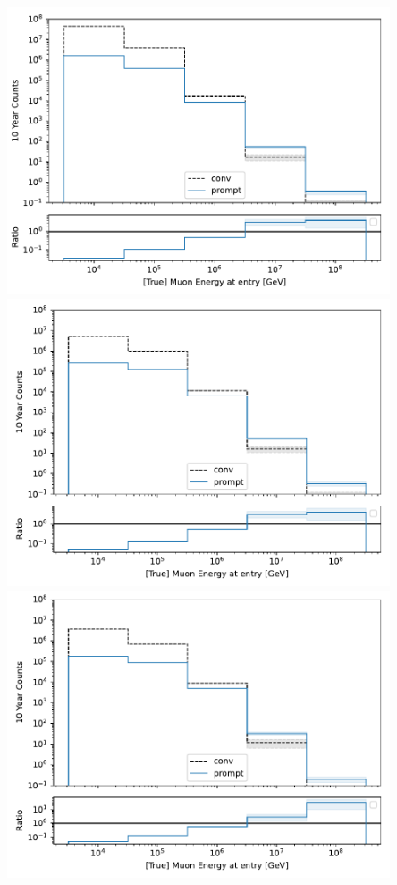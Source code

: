 \documentclass[aspectratio=1610, 9pt]{beamer}
\begin{document}
\begin{frame}
\begin{minipage}[t]{0.24\textwidth}
  \end{minipage}
  \begin{minipage}[t]{0.24\textwidth}
    \includegraphics[width=0.85\textwidth]{../Plots/leading_spectrum_mc.pdf}
    \includegraphics[width=0.85\textwidth]{../Plots/leading_spectrum_mc_5e5surface.pdf}
    \includegraphics[width=0.85\textwidth]{../Plots/leading_spectrum_mc_5e5surface_quality.pdf}

\end{minipage}
\end{frame}
\end{document}
